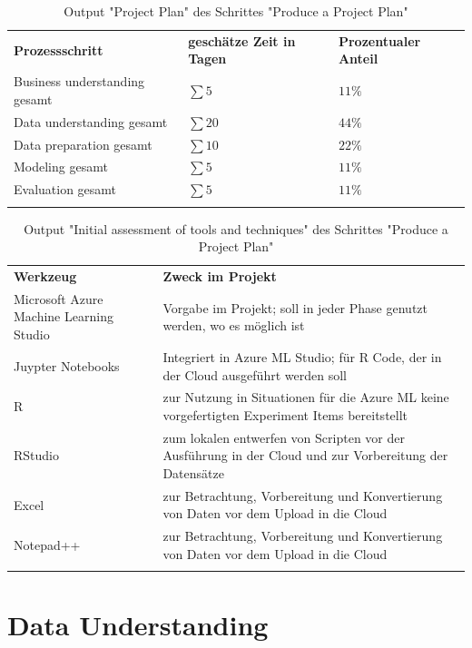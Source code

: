 \begin{centering} \begin{longtable}[!h]{|p{4cm}|p{4cm}|p{4cm}|}
\hline
\textbf{Prozessschritt} & \textbf{geschätze Zeit in Tagen} & \textbf{Prozentualer Anteil} \\
\hhline{===}
Business understanding gesamt & $\sum 5$ &  $11 \%$ \\ \hline
Data understanding gesamt & $\sum 20$ &  $44 \%$ \\ \hline
Data preparation gesamt & $\sum 10$ &  $22 \%$ \\ \hline
Modeling gesamt & $\sum 5$ &  $11 \%$ \\ \hline
Evaluation gesamt & $\sum 5$ &  $11 \%$ \\ \hline
\caption{Output "Project Plan" des Schrittes "Produce a Project Plan"}
\label{tab:projectPlan}
\end{longtable} \end{centering}
\begin{centering} \begin{longtable}[!h]{|p{4cm}|p{11cm}|}
\hline
\textbf{Werkzeug} & \textbf{Zweck im Projekt}\\ 
\hhline{==}
Microsoft Azure Machine Learning Studio & Vorgabe im Projekt; soll in jeder Phase genutzt werden, wo es möglich ist \\ \hline
Juypter Notebooks & Integriert in Azure ML Studio; für R Code, der in der Cloud ausgeführt werden soll \\ \hline
R & zur Nutzung in Situationen für die Azure ML keine vorgefertigten Experiment Items bereitstellt \\ \hline
RStudio & zum lokalen entwerfen von Scripten vor der Ausführung in der Cloud und zur Vorbereitung der Datensätze \\ \hline
Excel & zur Betrachtung, Vorbereitung und Konvertierung von Daten vor dem Upload in die Cloud \\ \hline
Notepad++ & zur Betrachtung, Vorbereitung und Konvertierung von Daten vor dem Upload in die Cloud \\ \hline
\caption{Output "Initial assessment of tools and techniques" des Schrittes "Produce a Project Plan"}
\end{longtable} \end{centering}

\section{Data Understanding}
